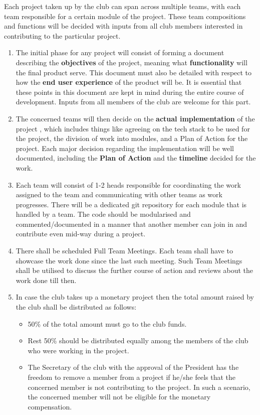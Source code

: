 \documentclass[11pt]{report}
\makeatletter
\newcommand{\bb}[1]{\textbf{#1}}
\renewcommand{\chapter}{\newpage\@startsection{chapter}{1}{0mm}{\baselineskip}{0.5\baselineskip}{\centering\sc\large\bf}}
\makeatother
\begin{document}
\chapter{Team Guidelines}
      Each project taken up by the club can span across multiple teams, with each team responsible for a certain module of the project. These team compositions and functions will be decided with inputs from all club members interested in contributing to the particular project. 
      \begin{enumerate}
            \item The initial phase for any project will consist of forming a document describing the \bb{objectives} of the project, meaning what \bb{functionality} will the final product serve. This document must also be detailed with respect to how the \bb{end user experience} of the product will be. It is essential that these points in this document are kept in mind during the entire course of development. Inputs from all members of the club are welcome for this part. 
            \item The concerned teams will then decide on the \bb{actual implementation} of the project , which includes things like agreeing on the tech stack to be used for the project, the division of work into modules, and a Plan of Action  for the project. Each major decision regarding the implementation will be well documented, including the \bb{Plan of Action} and the \bb{timeline} decided for the work.
            \item Each team will consist of 1-2 heads responsible for coordinating the work assigned to the team and communicating with other teams as work progresses. There will be a dedicated git repository for each module that is handled by a team. The code should be modularised and commented/documented in a manner that another member can join in and contribute even mid-way during a project.
            \item There shall be scheduled Full Team Meetings. Each team shall have to showcase the work done since the last such meeting. Such Team Meetings shall be utilised to discuss the further course of action and reviews about the work done till then.
            \item In case the club takes up a monetary project then the total amount raised by the club shall be distributed as follows:
                  \begin{itemize}
                        \item 50\% of the total amount must go to the club funds.
                        \item Rest 50\% should be distributed equally among the members of the club who were working in the project.
                        \item The Secretary of the club with the approval of the President has the freedom to remove a member from a project if he/she feels that the concerned member is not contributing to the project. In such a scenario, the concerned member will not be eligible for the monetary compensation.
                  \end{itemize}
      \end{enumerate}
\end{document}
